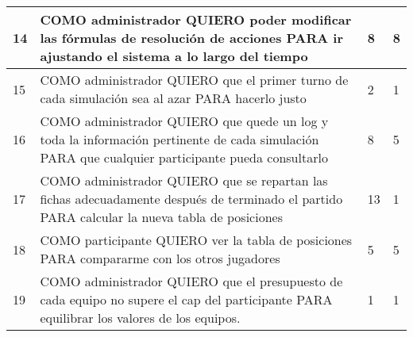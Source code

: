 \begin{center}
\begin{tabular}{| l | p{10cm} | l | l | }
14 & COMO administrador QUIERO poder modificar las fórmulas de resolución de acciones PARA ir ajustando el sistema a lo largo del tiempo & 8 & 8\\  \hline
15 & COMO administrador QUIERO que el primer turno de cada simulación sea al azar PARA hacerlo justo & 2 & 1\\  \hline
16 & COMO administrador QUIERO que quede un log y toda la información pertinente de cada simulación PARA que cualquier participante pueda consultarlo & 8 & 5\\  \hline
17 & COMO administrador QUIERO que se repartan las fichas adecuadamente después de terminado el partido PARA calcular la nueva tabla de posiciones & 13 & 1\\  \hline
18 & COMO participante QUIERO ver la tabla de posiciones PARA compararme con los otros jugadores & 5 & 5\\  \hline
19 & COMO administrador QUIERO que el presupuesto de cada equipo no supere el cap del participante PARA equilibrar los valores de los equipos. & 1 & 1\\  \hline
  \end{tabular}
\end{center}








